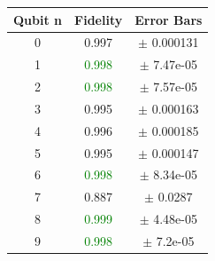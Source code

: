 \documentclass[9pt,a4paper]{src/templates/tau-class/tau}
\begin{document}
\hfill%
\begin{minipage}{0.48\textwidth}
\noindent\begin{minipage}[t]{0.48\linewidth}
\begin{center}
\begin{tabular}{@{}c c c@{}}
\toprule
Qubit n & Fidelity & Error Bars \\ \midrule


0 & 0.997 & $\pm$ 0.000131 \\



1 & \textcolor{green}{0.998} & $\pm$ 7.47e-05 \\



2 & \textcolor{green}{0.998} & $\pm$ 7.57e-05 \\



3 & 0.995 & $\pm$ 0.000163 \\



4 & 0.996 & $\pm$ 0.000185 \\



5 & 0.995 & $\pm$ 0.000147 \\



6 & \textcolor{green}{0.998} & $\pm$ 8.34e-05 \\



7 & 0.887 & $\pm$ 0.0287 \\



8 & \textcolor{green}{0.999} & $\pm$ 4.48e-05 \\



9 & \textcolor{green}{0.998} & $\pm$ 7.2e-05 \\























\end{tabular}
\end{center}
\end{minipage}
\end{minipage}
\end{document}
